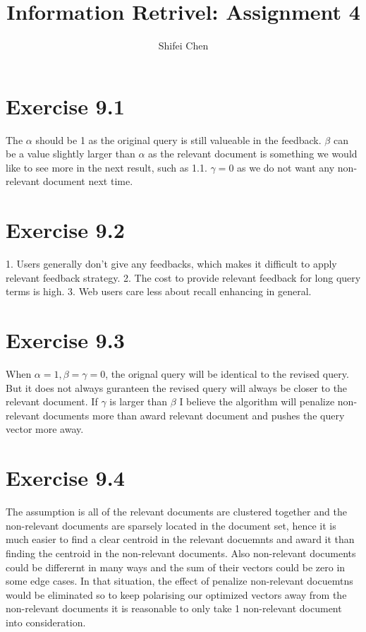 \documentclass[11pt]{article} %
\title{{\LARGE Information Retrivel: Assignment 4}\\[1.5mm]} %
\author{Shifei Chen} %
\begin{document}
\maketitle

\section*{Exercise 9.1}

The $\alpha$ should be 1 as the original query is still valueable in the feedback. $\beta$ can be a value slightly larger than $\alpha$ as the relevant document is something we would like to see more in the next result, such as 1.1. $\gamma=0$ as we do not want any non-relevant document next time.

\section{Exercise 9.2}

1. Users generally don't give any feedbacks, which makes it difficult to apply relevant feedback strategy.
2. The cost to provide relevant feedback for long query terms is high.
3. Web users care less about recall enhancing in general.

\section{Exercise 9.3}

When $\alpha=1, \beta=\gamma=0$, the orignal query will be identical to the revised query. But it does not always guranteen the revised query will always be closer to the relevant document. If $\gamma$ is larger than $\beta$ I believe the algorithm will penalize non-relevant documents more than award relevant document and pushes the query vector more away.

\section{Exercise 9.4}

The assumption is all of the relevant documents are clustered together and the  non-relevant documents are sparsely located in the document set, hence it is much easier to find a clear centroid in the relevant docuemnts and award it than finding the centroid in the non-relevant documents. Also non-relevant documents could be differernt in many ways and the sum of their vectors could be zero in some edge cases. In that situation, the effect of penalize non-relevant docuemtns would be eliminated so to keep polarising our optimized vectors away from the non-relevant documents it is reasonable to only take 1 non-relevant document into consideration.
\end{document}
